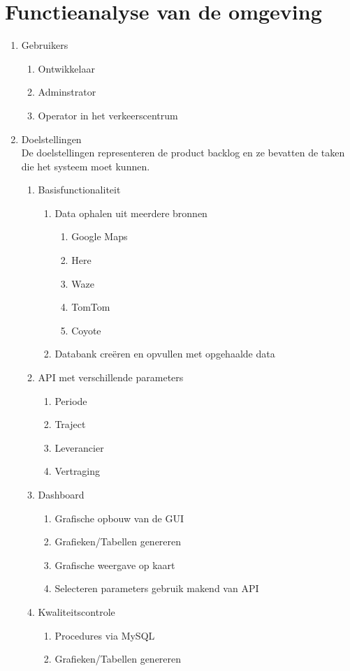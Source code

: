 \documentclass[ps,a4paper,oneside]{report}
\begin{document}
\section{Functieanalyse van de omgeving}
\begin{enumerate}
	\item Gebruikers
	\begin{enumerate}
		\item Ontwikkelaar
		\item Adminstrator
		\item Operator in het verkeerscentrum
	\end{enumerate}
\item Doelstellingen\\
De doelstellingen representeren de product backlog en ze bevatten de taken die het systeem moet kunnen.
\begin{enumerate}
	\item Basisfunctionaliteit
		\begin{enumerate}
			\item Data ophalen uit meerdere bronnen
			\begin{enumerate}
				\item Google Maps
				\item Here
				\item Waze
				\item TomTom
				\item Coyote
			\end{enumerate}
			\item Databank cre\"eren en opvullen met opgehaalde data
		\end{enumerate}
	\item API met verschillende parameters
	\begin{enumerate}
		\item Periode
		\item Traject
		\item Leverancier
		\item Vertraging
	\end{enumerate}
	\item Dashboard
	\begin{enumerate}
		\item Grafische opbouw van de GUI
		\item Grafieken/Tabellen genereren
		\item Grafische weergave op kaart
		\item Selecteren parameters gebruik makend van API
	\end{enumerate}	
	\item Kwaliteitscontrole
	\begin{enumerate}
		\item Procedures via MySQL
		\item Grafieken/Tabellen genereren
	\end{enumerate}
\end{enumerate}
\end{enumerate}
\end{document}
